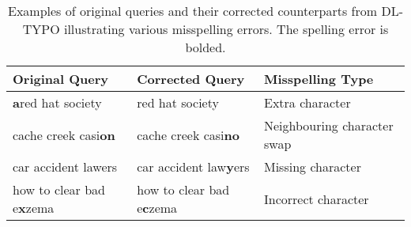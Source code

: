 \begin{table}[h]
\centering
\caption{Examples of original queries and their corrected counterparts from DL-TYPO illustrating various misspelling errors. The spelling error is bolded.}
\label{tab:dl-egs}
\begin{tabular}{l|l|l}
\textbf{Original Query} & \textbf{Corrected Query} & \textbf{Misspelling Type} \\ \hline
\textbf{a}red hat society & red hat society & Extra character \\
cache creek casi\textbf{on} & cache creek casi\textbf{no} & Neighbouring character swap \\
car accident lawers & car accident law\textbf{y}ers & Missing character \\
how to clear bad e\textbf{x}zema & how to clear bad e\textbf{c}zema & Incorrect character \\ \hline
\end{tabular}
\end{table}